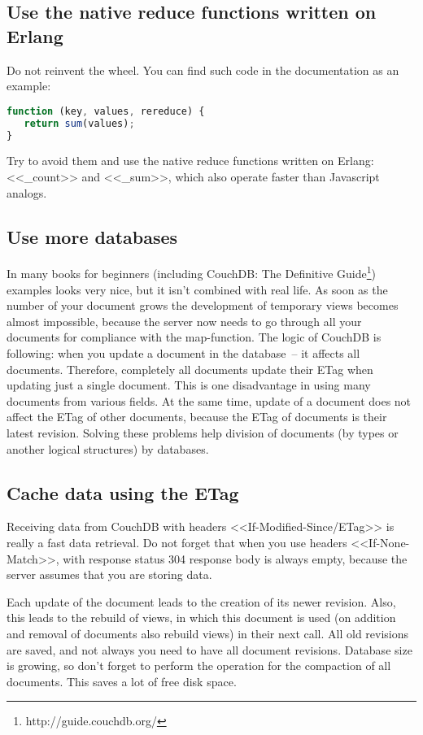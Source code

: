 \subsection{Use the native reduce functions written on Erlang}

Do not reinvent the wheel. You can find such code in the documentation as an example:

\begin{lstlisting}[language=Javascript]
function (key, values, rereduce) {
   return sum(values);
}
\end{lstlisting}

Try to avoid them and use the native reduce functions written on Erlang: <<\_count>> and <<\_sum>>, which also operate faster than Javascript analogs.

\subsection{Use more databases}

In many books for beginners (including CouchDB: The Definitive Guide\footnote{http://guide.couchdb.org/}) examples looks very nice, but it isn’t combined with real life. As soon as the number of your document grows the development of temporary views becomes almost impossible, because the server now needs to go through all your documents for compliance with the map-function. The logic of CouchDB is following: when you update a document in the database~-- it affects all documents. Therefore, completely all documents update their ETag when updating just a single document. This is one disadvantage in using many documents from various fields. At the same time, update of a document does not affect the ETag of other documents, because the ETag of documents is their latest revision. Solving these problems help division of documents (by types or another logical structures) by databases.

\subsection{Cache data using the ETag}

Receiving data from CouchDB with headers <<If-Modified-Since/ETag>> is really a fast data retrieval. Do not forget that when you use headers <<If-None-Match>>, with response status 304 response body is always empty, because the server assumes that you are storing data.

Each update of the document leads to the creation of its newer revision. Also, this leads to the rebuild of views, in which this document is used (on addition and removal of documents also rebuild views) in their next call. All old revisions are saved, and not always you need to have all document revisions. Database size is growing, so don't forget to perform the operation for the compaction of all documents. This saves a lot of free disk space.

